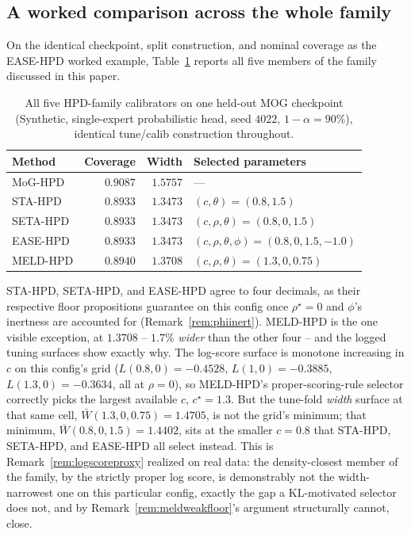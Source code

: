 \documentclass[10pt,twocolumn,a4paper]{article}
\begin{document}
\subsection{A worked comparison across the whole family}
On the identical checkpoint, split construction, and nominal coverage as the EASE-HPD worked example,
Table~\ref{tab:allfive} reports all five members of the family discussed in this paper.

\begin{table}[H]
\centering
\caption{All five HPD-family calibrators on one held-out MOG checkpoint (Synthetic, single-expert
probabilistic head, seed $4022$, $1-\alpha=90\%$), identical tune/calib construction throughout.}
\label{tab:allfive}
\begin{tabular}{@{}lrrl@{}}
\toprule
\textbf{Method} & \textbf{Coverage} & \textbf{Width} & \textbf{Selected parameters} \\
\midrule
MoG-HPD & $0.9087$ & $1.5757$ & --- \\
STA-HPD & $0.8933$ & $1.3473$ & $(c,\theta){=}(0.8,1.5)$ \\
SETA-HPD & $0.8933$ & $1.3473$ & $(c,\rho,\theta){=}(0.8,0,1.5)$ \\
EASE-HPD & $0.8933$ & $1.3473$ & $(c,\rho,\theta,\phi){=}(0.8,0,1.5,{-1.0})$ \\
MELD-HPD & $0.8940$ & $1.3708$ & $(c,\rho,\theta){=}(1.3,0,0.75)$ \\
\bottomrule
\end{tabular}
\end{table}

STA-HPD, SETA-HPD, and EASE-HPD agree to four decimals, as their respective floor propositions
guarantee on this config once $\rho^\star=0$ and $\phi$'s inertness are accounted for
(Remark~\ref{rem:phiinert}). MELD-HPD is the one visible exception, at $1.3708$ -- $1.7\%$
\emph{wider} than the other four -- and the logged tuning surfaces show exactly why. The log-score
surface is monotone increasing in $c$ on this config's grid ($L(0.8,0)=-0.4528$, $L(1,0)=-0.3885$,
$L(1.3,0)=-0.3634$, all at $\rho=0$), so MELD-HPD's proper-scoring-rule selector correctly picks the
largest available $c$, $c^\star=1.3$. But the tune-fold \emph{width} surface at that same cell,
$\bar W(1.3,0,0.75)=1.4705$, is not the grid's minimum; that minimum, $\bar W(0.8,0,1.5)=1.4402$, sits
at the smaller $c=0.8$ that STA-HPD, SETA-HPD, and EASE-HPD all select instead. This is
Remark~\ref{rem:logscoreproxy} realized on real data: the density-closest member of the family, by
the strictly proper log score, is demonstrably not the width-narrowest one on this particular config,
exactly the gap a KL-motivated selector does not, and by Remark~\ref{rem:meldweakfloor}'s argument
structurally cannot, close.
\end{document}
